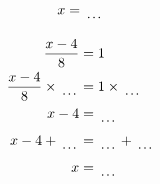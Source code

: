 \documentclass[12pt]{article}
\newcounter{minipagecount}
\begin{document}
\begin{multicols}{2}
\begin{minipage}[t]{0.45\textwidth}
\begin{align*}
        x &= \dotuline{\hspace{5mm}}\\
    \end{align*}
\end{minipage} %
\noindent{(\theminipagecount)}\hspace{0.1mm} %
\begin{minipage}[t]{0.45\textwidth} %
    \vspace{-26pt}  %
    \raggedright %
    \begin{align*} %
        \frac{x - 4}{8} &= 1\\
        \frac{x - 4}{8} \times\dotuline{\hspace{5mm}} &= 1 \times\dotuline{\hspace{5mm}}\\
        x - 4 &= \dotuline{\hspace{5mm}}\\
        x - 4 + \dotuline{\hspace{5mm}} &= \dotuline{\hspace{5mm}} + \dotuline{\hspace{5mm}}\\
        x &= \dotuline{\hspace{5mm}}\\
    \end{align*}
\end{minipage}\newpage
\noindent{(\theminipagecount)}\hspace{0.1mm} %
\begin{minipage}[t]{0.45\textwidth} %
    \vspace{-26pt}  %

\end{minipage}
\end{multicols}
\end{document}
